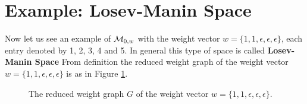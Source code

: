 \section{Example: Losev-Manin Space}
\label{sec:losev-manin-space}
    Now let us see an example of $\mathcal{M}_{0, w}$ 
	with the weight vector $w = \{1, 1, \epsilon, \epsilon, \epsilon\}$,
    each entry denoted by 1, 2, 3, 4 and 5.
	In general this type of space is called \textbf{Losev-Manin Space}
	From definition the reduced weight graph of the weight vector $w = \{1, 1, \epsilon, \epsilon, \epsilon\}$ is as in Figure \ref{fig:losev-manin5-reduced-graph}.
    
    \begin{figure}
	\begin{center}
	\end{center}
	\caption{The reduced weight graph $G$ of the weight vector $w = \{1, 1, \epsilon, \epsilon, \epsilon\}$.}
	\label{fig:losev-manin5-reduced-graph}
    \end{figure}
    
